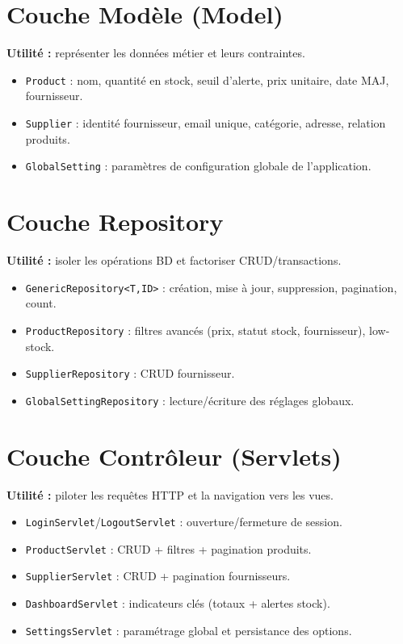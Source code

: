 \documentclass[12pt,a4paper]{report}
\begin{document}
\section{Couche Mod\`ele (Model)}
\textbf{Utilit\'e :} repr\'esenter les donn\'ees m\'etier et leurs contraintes.
\begin{itemize}[leftmargin=1.2cm]
    \item \texttt{Product} : nom, quantit\'e en stock, seuil d'alerte, prix unitaire, date MAJ, fournisseur.
    \item \texttt{Supplier} : identit\'e fournisseur, email unique, cat\'egorie, adresse, relation produits.
    \item \texttt{GlobalSetting} : param\`etres de configuration globale de l'application.
\end{itemize}

\section{Couche Repository}
\textbf{Utilit\'e :} isoler les op\'erations BD et factoriser CRUD/transactions.
\begin{itemize}[leftmargin=1.2cm]
    \item \texttt{GenericRepository<T,ID>} : cr\'eation, mise \`a jour, suppression, pagination, count.
    \item \texttt{ProductRepository} : filtres avanc\'es (prix, statut stock, fournisseur), low-stock.
    \item \texttt{SupplierRepository} : CRUD fournisseur.
    \item \texttt{GlobalSettingRepository} : lecture/\'ecriture des r\'eglages globaux.
\end{itemize}

\section{Couche Contr\^oleur (Servlets)}
\textbf{Utilit\'e :} piloter les requ\^etes HTTP et la navigation vers les vues.
\begin{itemize}[leftmargin=1.2cm]
    \item \texttt{LoginServlet}/\texttt{LogoutServlet} : ouverture/fermeture de session.
    \item \texttt{ProductServlet} : CRUD + filtres + pagination produits.
    \item \texttt{SupplierServlet} : CRUD + pagination fournisseurs.
    \item \texttt{DashboardServlet} : indicateurs cl\'es (totaux + alertes stock).
    \item \texttt{SettingsServlet} : param\'etrage global et persistance des options.
\end{itemize}
\end{document}
